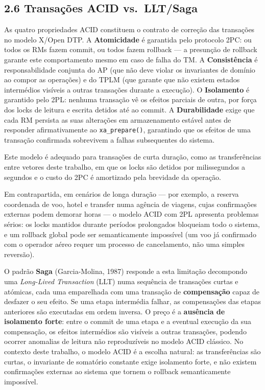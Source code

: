 \subsection*{2.6 Transações ACID vs.\ LLT/Saga}

As quatro propriedades ACID constituem o contrato de correção das transações no modelo X/Open
DTP. A \textbf{Atomicidade} é garantida pelo protocolo 2PC: ou todos os RMs fazem commit, ou
todos fazem rollback --- a presunção de rollback garante este comportamento mesmo em caso de
falha do TM. A \textbf{Consistência} é responsabilidade conjunta do AP (que não deve violar os
invariantes de domínio ao compor as operações) e do TPLM (que garante que não existem estados
intermédios visíveis a outras transações durante a execução). O \textbf{Isolamento} é garantido
pelo 2PL: nenhuma transação vê os efeitos parciais de outra, por força dos locks de leitura e
escrita detidos até ao commit. A \textbf{Durabilidade} exige que cada RM persista as suas
alterações em armazenamento estável antes de responder afirmativamente ao \texttt{xa\_prepare()},
garantindo que os efeitos de uma transação confirmada sobrevivem a falhas subsequentes do sistema.

Este modelo é adequado para transações de curta duração, como as transferências entre vetores
deste trabalho, em que os locks são detidos por milissegundos a segundos e o custo do 2PC é
amortizado pela brevidade da operação.

Em contrapartida, em cenários de longa duração --- por exemplo, a reserva coordenada de voo,
hotel e transfer numa agência de viagens, cujas confirmações externas podem demorar horas --- o
modelo ACID com 2PL apresenta problemas sérios: os locks mantidos durante períodos prolongados
bloqueiam todo o sistema, e um rollback global pode ser semanticamente impossível (um voo já
confirmado com o operador aéreo requer um processo de cancelamento, não uma simples reversão).

O padrão \textbf{Saga} (Garcia-Molina, 1987) responde a esta limitação decompondo uma
\textit{Long-Lived Transaction} (LLT) numa sequência de transações curtas e atómicas, cada
uma emparelhada com uma transação de \textbf{compensação} capaz de desfazer o seu efeito. Se
uma etapa intermédia falhar, as compensações das etapas anteriores são executadas em ordem
inversa. O preço é a \textbf{ausência de isolamento forte}: entre o commit de uma etapa e a
eventual execução da sua compensação, os efeitos intermédios são visíveis a outras transações,
podendo ocorrer anomalias de leitura não reproduzíveis no modelo ACID clássico. No contexto
deste trabalho, o modelo ACID é a escolha natural: as transferências são curtas, o invariante
de somatório constante exige isolamento forte, e não existem confirmações externas ao sistema
que tornem o rollback semanticamente impossível.

